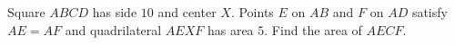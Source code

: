 Square $ABCD$ has side $10$ and center $X$. Points $E$ on $AB$ and $F$ on $AD$ satisfy $AE=AF$ and quadrilateral $AEXF$ has area $5$. Find the area of $AECF$.
